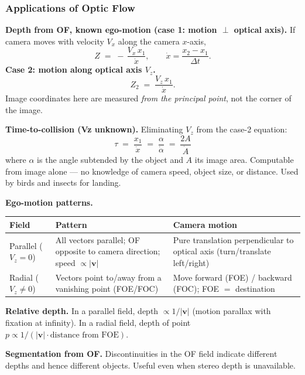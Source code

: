 \subsubsection{Applications of Optic Flow}

\textbf{Depth from OF, known ego-motion (case 1: motion $\perp$ optical axis).} If camera moves with velocity $V_x$ along the camera $x$-axis,
\[
Z \;=\; -\,\frac{V_x\, x_1}{\dot{x}}, \qquad \dot{x} = \frac{x_2 - x_1}{\Delta t}.
\]
\textbf{Case 2: motion along optical axis $V_z$.}
\[
Z_2 \;=\; \frac{V_z\, x_1}{\dot{x}}.
\]
Image coordinates here are measured \emph{from the principal point}, not the corner of the image.

\separator

\textbf{Time-to-collision (Vz unknown).} Eliminating $V_z$ from the case-2 equation:
\[
\boxed{\;\tau \;=\; \frac{x_1}{\dot{x}} \;=\; \frac{\alpha}{\dot{\alpha}} \;=\; \frac{2 A}{\dot{A}}\;}
\]
where $\alpha$ is the angle subtended by the object and $A$ its image area. Computable from image alone --- no knowledge of camera speed, object size, or distance. Used by birds and insects for landing.

\separator

\textbf{Ego-motion patterns.}

\begin{center}
\renewcommand{\arraystretch}{1.3}
\begin{tabular}{@{} l p{5.5cm} p{4.5cm} @{}}
\toprule
\textbf{Field} & \textbf{Pattern} & \textbf{Camera motion} \\
\midrule
Parallel ($V_z = 0$) & All vectors parallel; OF opposite to camera direction; speed $\propto |\mathbf{v}|$ & Pure translation perpendicular to optical axis (turn/translate left/right) \\
Radial ($V_z \neq 0$) & Vectors point to/away from a vanishing point (FOE/FOC) & Move forward (FOE) / backward (FOC); FOE $=$ destination \\
\bottomrule
\end{tabular}
\end{center}

\textbf{Relative depth.} In a parallel field, depth $\propto 1/|\mathbf{v}|$ (motion parallax with fixation at infinity). In a radial field, depth of point $p \propto 1/(|\mathbf{v}| \cdot \text{distance from FOE})$.

\separator

\textbf{Segmentation from OF.} Discontinuities in the OF field indicate different depths and hence different objects. Useful even when stereo depth is unavailable.

